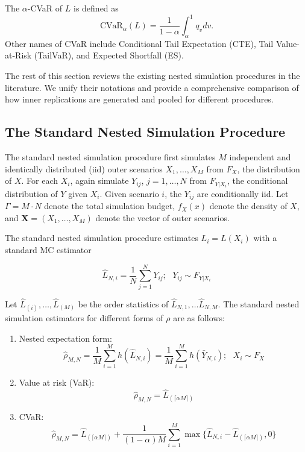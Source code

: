 The $\alpha$-CVaR of $L$ is defined as
\begin{equation} \label{eq1:cvar}
    \mbox{CVaR}_\alpha(L) =\frac{1}{1-\alpha} \int_{\alpha}^{1} q_v dv. 
\end{equation}
Other names of CVaR include Conditional Tail Expectation (CTE), Tail Value-at-Risk (TailVaR), and Expected Shortfall (ES).

The rest of this section reviews the existing nested simulation procedures in the literature.
We unify their notations and provide a comprehensive comparison of how inner replications are generated and pooled for different procedures.

\subsection{The Standard Nested Simulation Procedure}

The standard nested simulation procedure first simulates $M$ independent and identically distributed (iid) outer scenarios $X_1, \dots, X_M$ from $F_X$, the distribution of $X$.
For each $X_i$, again simulate $Y_{ij}$, $j = 1, \dots, N$ from $F_{Y|X_i}$, the conditional distribution of $Y$ given $X_i$. Given scenario $i$, the $Y_{ij}$ are conditionally iid. Let $\Gamma = M \cdot N$ denote the total simulation budget, $f_X(x)$ denote the density of $X$, and $\mathbf{X} = (X_1, \dots, X_M)$ denote the vector of outer scenarios.

The standard nested simulation procedure estimates $L_i = L(X_i)$ with a standard MC estimator 

$$\hat{L}_{N, i} = \frac{1}{N} \sum_{j=1}^N Y_{ij}; ~~~ Y_{ij} \sim F_{Y|X_i} $$

Let $\hat{L}_{(i)}, \dots, \hat{L}_{(M)}$ be the order statistics of $\hat{L}_{N, 1}, \dots \hat{L}_{N, M}$. 
The standard nested simulation estimators for different forms of $\rho$ are as follows:

\begin{enumerate}
    \item   Nested expectation form:
            $$\hat{\rho}_{M, N} = \frac{1}{M} \sum_{i=1}^M h(\hat{L}_{N, i}) = \frac{1}{M} \sum_{i=1}^M h(\bar{Y}_{N, i}); ~~~ X_i \sim F_X$$
    \item   Value at risk (VaR):
            $$\hat{\rho}_{M, N} = \hat{L}_{(\lceil \alpha M \rceil)}$$
    \item   CVaR:
            \begin{equation} \label{eq1:cvar-hat}
                \hat{\rho}_{M, N} = \hat{L}_{(\lceil \alpha M \rceil)} + \frac{1}{(1-\alpha) M} \sum_{i=1}^M \max \{\hat{L}_{N, i} - \hat{L}_{(\lceil \alpha M \rceil)}, 0 \}
            \end{equation}
\end{enumerate}

